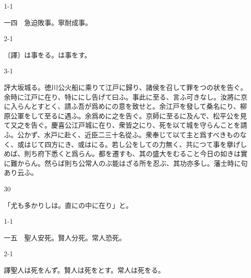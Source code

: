\documentclass[tate,paper=b6j,jafontsize=9pt]{jlreq}
\begin{document}
\begin{azconvIndented}{1\zw}{-1\zw}

一四　急迫敗事。寧耐成事。

\end{azconvIndented}
\begin{azconvIndented}{2\zw}{-1\zw}

〔譯〕は事をる。は事をす。

\end{azconvIndented}
\begin{azconvIndented}{3\zw}{-1\zw}

評大坂城る。徳川公火船に乘りて江戸に歸り、諸侯を召して罪をつの状を告ぐ。余時に江戸に在り、特ににし告げて曰ふ。事此に至る、言ふ可きなし。汝將に京に入らんとすとく、請ふ吾が爲めにの意を致せと。余江戸を發して桑名にり、柳原公軍をして至るに遇ふ。余爲めに之を告ぐ。京師に至るに及んで、松平公を見て又之を告ぐ。慶喜公江戸城に在り、衆皆之にり、死を以て城を守らんことを請ふ。公かず、水戸に赴く、近臣二三十名從ふ。衆奉じて以て主と爲すべきものなく、或はじて四方にき、或はにる。若し公をしての力無く、共につて事を擧げしめば、則ち府下悉くと爲らん。都を遷すも、其の盛大をむること今日の如きは實に難からん。然らば則ち公常人のぶ能はざる所を忍ぶ、其功亦多し。藩士時に句あり云ふ。

\end{azconvIndented}
\begin{azconvIndented}{3\zw}{0\zw}

「尤も多かりしは。直にの中に在り」と。

\end{azconvIndented}

\begin{azconvIndented}{1\zw}{-1\zw}

一五　聖人安死。賢人分死。常人恐死。

\end{azconvIndented}
\begin{azconvIndented}{2\zw}{-1\zw}

譯聖人は死をんず。賢人は死をとす。常人は死をる。

\end{azconvIndented}
\end{document}
